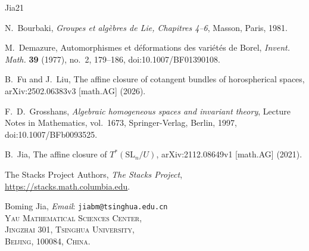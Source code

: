 \documentclass[10pt,a4paper]{amsart}
\newcommand{\SL}{\mathrm{SL}}
\begin{document}
{\small
\begin{thebibliography}{Jia21}
\setlength{\itemsep}{0pt}
\setlength{\parsep}{0pt}

N.~Bourbaki, \emph{Groupes et alg\`ebres de Lie, Chapitres 4--6}, Masson, Paris, 1981.

M.~Demazure, Automorphismes et d\'eformations des vari\'et\'es de Borel, \emph{Invent. Math.} \textbf{39} (1977), no.~2, 179--186, doi:10.1007/BF01390108.

B.~Fu and J.~Liu, The affine closure of cotangent bundles of horospherical spaces, arXiv:2502.06383v3 [math.AG] (2026).

F.~D.~Grosshans, \emph{Algebraic homogeneous spaces and invariant theory}, Lecture Notes in Mathematics, vol.~1673, Springer-Verlag, Berlin, 1997, doi:10.1007/BFb0093525.

B.~Jia, The affine closure of $T^*(\SL_n/U)$, arXiv:2112.08649v1 [math.AG] (2021).

The Stacks Project Authors, \emph{The Stacks Project},
\url{https://stacks.math.columbia.edu}.

\end{thebibliography}
}

\medskip
\footnotesize
\noindent Boming Jia, \textit{Email}: \texttt{jiabm@tsinghua.edu.cn}\\
\textsc{Yau Mathematical Sciences Center,\\
Jingzhai 301, Tsinghua University,\\
Beijing, 100084, China.}
\end{document}
